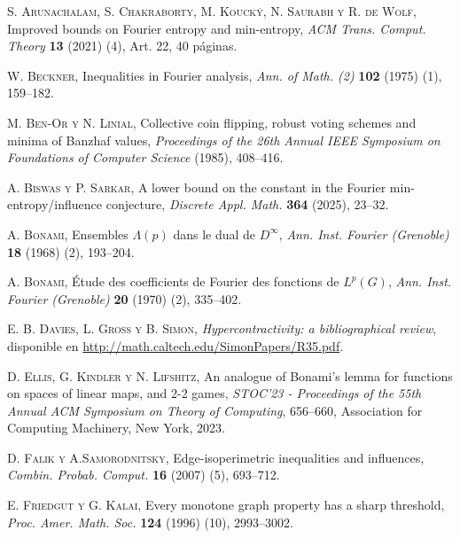 \documentclass[autocontact]{gaceta}
\begin{document}
\begin{thebibliography}{09}

\textsc{S. Arunachalam, S. Chakraborty, M. Kouck\'y, N. Saurabh y R. de Wolf},
Improved bounds on Fourier entropy and min-entropy,
\textit{ACM Trans. Comput. Theory} \textbf{13} (2021) (4), Art. 22, 40 páginas.

\textsc{W. Beckner},
Inequalities in Fourier analysis,
\textit{Ann. of Math. (2)} \textbf{102} (1975) (1), 159--182.

\textsc{M. Ben-Or y N. Linial},
Collective coin flipping, robust voting schemes and minima of Banzhaf values,
\textit{Proceedings of the 26th Annual IEEE Symposium on Foundations of Computer Science} (1985), 408--416.

\textsc{A. Biswas y P. Sarkar},
A lower bound on the constant in the Fourier min-entropy/influence conjecture,
\textit{Discrete Appl. Math.} \textbf{364} (2025), 23--32.

\textsc{A. Bonami},
Ensembles $\Lambda(p)$ dans le dual de $D^{\infty}$,
\textit{Ann. Inst. Fourier (Grenoble)} \textbf{18} (1968) (2), 193--204.

\textsc{A. Bonami},
Étude des coefficients de Fourier des fonctions de $L^p(G)$,
\textit{Ann. Inst. Fourier (Grenoble)} \textbf{20} (1970) (2), 335--402.


\textsc{E. B. Davies, L. Gross y B. Simon},
\textit{Hypercontractivity: a bibliographical review},
disponible en \url{http://math.caltech.edu/SimonPapers/R35.pdf}.

\textsc{D. Ellis, G. Kindler y N. Lifshitz},
An analogue of Bonami's lemma for functions on spaces of linear maps, and 2-2 games,
\textit{STOC'23 - Proceedings of the 55th Annual ACM Symposium on Theory of Computing}, 656--660, Association for Computing Machinery, New York, 2023.

\textsc{D. Falik y A.Samorodnitsky},
Edge-isoperimetric inequalities and influences,
\textit{Combin. Probab. Comput.} \textbf{16} (2007) (5), 693--712.

\textsc{E. Friedgut y G. Kalai},
Every monotone graph property has a sharp threshold,
\textit{Proc. Amer. Math. Soc.} \textbf{124} (1996) (10), 2993--3002.


\end{thebibliography}
\end{document}
